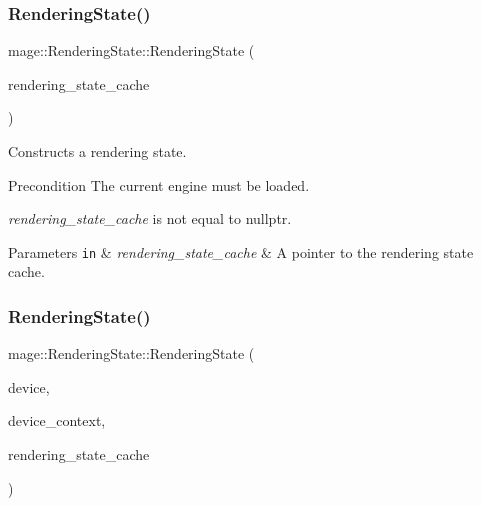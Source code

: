 \subsubsection{\texorpdfstring{Rendering\+State()}{RenderingState()}\hspace{0.1cm}{\footnotesize\ttfamily [1/4]}}
{\footnotesize\ttfamily mage\+::\+Rendering\+State\+::\+Rendering\+State (\begin{DoxyParamCaption}\item[{\hyperlink{structmage_1_1_rendering_state_cache}{Rendering\+State\+Cache} $\ast$}]{rendering\+\_\+state\+\_\+cache }\end{DoxyParamCaption})\hspace{0.3cm}{\ttfamily [explicit]}}

Constructs a rendering state.

\begin{DoxyPrecond}{Precondition}
The current engine must be loaded. 

{\itshape rendering\+\_\+state\+\_\+cache} is not equal to {\ttfamily nullptr}. 
\end{DoxyPrecond}

\begin{DoxyParams}[1]{Parameters}
\mbox{\tt in}  & {\em rendering\+\_\+state\+\_\+cache} & A pointer to the rendering state cache. \\
\hline
\end{DoxyParams}
\hypertarget{structmage_1_1_rendering_state_a6a1914effafb160ff1d05c8a1963278a}{}\label{structmage_1_1_rendering_state_a6a1914effafb160ff1d05c8a1963278a} 
\subsubsection{\texorpdfstring{Rendering\+State()}{RenderingState()}\hspace{0.1cm}{\footnotesize\ttfamily [2/4]}}
{\footnotesize\ttfamily mage\+::\+Rendering\+State\+::\+Rendering\+State (\begin{DoxyParamCaption}\item[{I\+D3\+D11\+Device2 $\ast$}]{device,  }\item[{I\+D3\+D11\+Device\+Context2 $\ast$}]{device\+\_\+context,  }\item[{\hyperlink{structmage_1_1_rendering_state_cache}{Rendering\+State\+Cache} $\ast$}]{rendering\+\_\+state\+\_\+cache }\end{DoxyParamCaption})\hspace{0.3cm}{\ttfamily [explicit]}}

